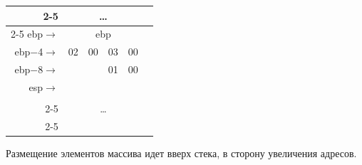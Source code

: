 \documentclass[12pt, letterpaper]{article}
\begin{document}
\begin{minipage}{.45\textwidth}
    \centering
    \begin{tabular}{r||m{1em}|m{1em}|m{1em}|m{1em}||m{1em}}
        \cline{2-5}
        &\multicolumn{4}{|c||}{\dots} &\\
        \cline{2-5}
        ebp$\longrightarrow$ &\multicolumn{4}{|c||}{ebp} &\\
        \hhline{~----~}
        ebp$-$4$\longrightarrow$ & \cellcolor{pink!=100} 02 & \cellcolor{pink!=100} 00 & \cellcolor{pink!=130} 03 & \cellcolor{pink!=130} 00 & \\
        \hhline{~----~}
        ebp$-$8$\longrightarrow$ &  &  & \cellcolor{pink!=50} 01 & \cellcolor{pink!=50} 00 & \\
        \hhline{~----~}
        esp$\longrightarrow$ & &  &  &  & \\
        \hhline{~----~}
        & &  &  &  & \\
        \cline{2-5}
        &\multicolumn{4}{|c||}{\dots} &\\
        \cline{2-5}
    \end{tabular}
    
\end{minipage}
\newline

Размещение элементов массива идет вверх стека, в сторону увеличения адресов.\\
\end{document}
